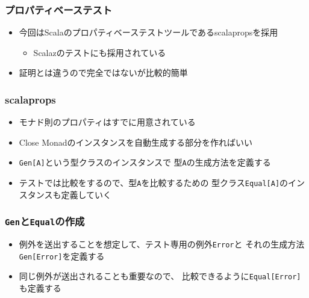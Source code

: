\begin{frame}
  \frametitle{プロパティベーステスト}


  \begin{itemize}
    \item<3-> 今回はScalaのプロパティベーステストツールであるscalaprops\cite{scalaprops}を採用
    \begin{itemize}
      \item<4-> Scalaz\cite{scalaz}のテストにも採用されている
    \end{itemize}
    \item<5-> 証明とは違うので完全ではないが比較的簡単
  \end{itemize}
\end{frame}

\begin{frame}
  \frametitle{scalaprops}

  \begin{itemize}
    \item<2-> モナド則のプロパティはすでに用意されている
    \item<3-> Close Monadのインスタンスを自動生成する部分を作ればいい
    \item<4-> \lstinline|Gen[A]|という型クラスのインスタンスで
    型\lstinline|A|の生成方法を定義する
    \item<5-> テストでは比較をするので、型\lstinline|A|を比較するための
    型クラス\lstinline|Equal[A]|のインスタンスも定義していく
  \end{itemize}
\end{frame}

\begin{frame}
  \frametitle{\protect\lstinline|Gen|と\protect\lstinline|Equal|の作成}


  \begin{itemize}
    \item<3-> 例外を送出することを想定して、テスト専用の例外\lstinline|Error|と
    それの生成方法\lstinline|Gen[Error]|を定義する
    \item<4-> 同じ例外が送出されることも重要なので、
    比較できるように\lstinline|Equal[Error]|も定義する
  \end{itemize}
\end{frame}

